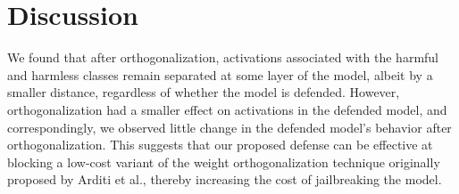 \documentclass[10pt,letterpaper]{article}
\begin{document}
\section{Discussion}

We found that after orthogonalization, activations associated with the harmful and harmless classes remain separated at some layer of the model, albeit by a smaller distance, regardless of whether the model is defended. However, orthogonalization had a smaller effect on activations in the defended model, and correspondingly, we observed little change in the defended model's behavior after orthogonalization. This suggests that our proposed defense can be effective at blocking a low-cost variant of the weight orthogonalization technique originally proposed by Arditi et al., thereby increasing the cost of jailbreaking the model.
\end{document}
